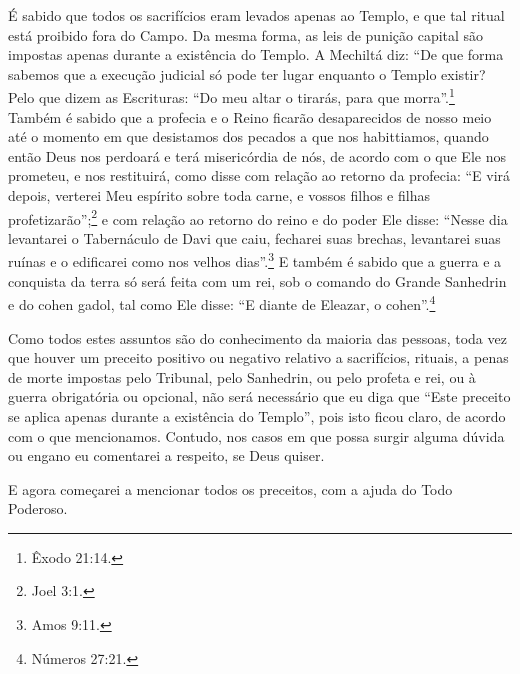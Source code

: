 É sabido que todos os sacrifícios eram levados apenas ao Templo, e que
tal ritual está proibido fora do Campo. Da mesma forma, as leis de
punição capital são impostas apenas durante a existência do Templo. A
Mechiltá\starr{} diz: ``De que forma sabemos que a execução judicial só pode ter
lugar enquanto o Templo existir? Pelo que dizem as Escrituras: ``Do meu
altar o tirarás, para que morra''.\footnote{Êxodo 21:14.} Também é sabido que a
profecia e o Reino ficarão desaparecidos de nosso meio até o momento em
que desistamos dos pecados a que nos habittiamos, quando então Deus nos
perdoará e terá misericórdia de nós, de acordo com o que Ele nos
prometeu, e nos restituirá, como disse com relação ao retorno da
profecia: ``E virá depois, verterei Meu espírito sobre toda carne, e
vossos filhos e filhas profetizarão'';\footnote{Joel 3:1.} e com relação ao
retorno do reino e do poder Ele disse: ``Nesse dia levantarei o
Tabernáculo de Davi que caiu, fecharei suas brechas, levantarei suas
ruínas e o edificarei como nos velhos dias''.\footnote{Amos 9:11.} E também é
sabido que a guerra e a conquista da terra só será feita com um rei, sob
o comando do Grande Sanhedrin\starr{} e do cohen gadol\starr, tal como Ele disse:
``E diante de Eleazar\starr, o cohen\starr''.\footnote{Números 27:21.}


Como todos estes assuntos são do conhecimento da maioria das pessoas,
toda vez que houver um preceito positivo ou negativo relativo a
sacrifícios, rituais, a penas de morte impostas pelo Tribunal, pelo
Sanhedrin\starr, ou pelo profeta e rei, ou à guerra obrigatória ou opcional,
não será necessário que eu diga que ``Este preceito se aplica apenas
durante a existência do Templo'', pois isto ficou claro, de acordo com o
que mencionamos. Contudo, nos casos em que possa surgir alguma dúvida ou
engano eu comentarei a respeito, se Deus quiser.

E agora começarei a mencionar todos os preceitos, com a ajuda do Todo
Poderoso.

